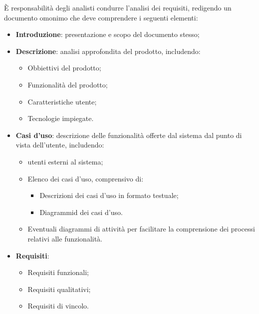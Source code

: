 È responsabilità degli analisti condurre l'analisi dei requisiti, redigendo un documento omonimo che deve comprendere i seguenti elementi:
\begin{itemize}
	\item \textbf{Introduzione}: presentazione e scopo del documento stesso;
	\item \textbf{Descrizione}:  analisi approfondita del prodotto, includendo:
	      \begin{itemize}
		      \item Obbiettivi del prodotto;
		      \item Funzionalità del prodotto;
		      \item Caratteristiche utente;
		      \item Tecnologie impiegate.
	      \end{itemize}
	\item \textbf{Casi d'uso}: descrizione delle funzionalità offerte dal sistema dal punto di vista dell'utente, includendo:
	      \begin{itemize}
		      \item utenti esterni al sistema;
		      \item Elenco dei casi d'uso, comprensivo di:
		            \begin{itemize}
			            \item Descrizioni dei casi d'uso in formato testuale;
			            \item Diagrammid dei casi d'uso.
		            \end{itemize}
		      \item Eventuali diagrammi di attività per facilitare la comprensione dei processi relativi alle funzionalità.
	      \end{itemize}
	\item \textbf{Requisiti}:
	      \begin{itemize}
		      \item Requisiti funzionali;
		      \item Requisiti qualitativi;
		      \item Requisiti di vincolo.
	      \end{itemize}
\end{itemize}

